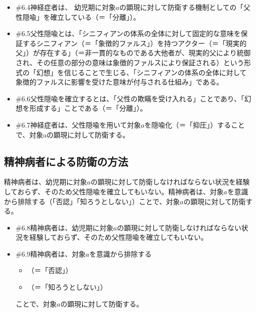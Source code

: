 \begin{note}{}
  \begin{itemize}
    \tightlist
    \item{\#6.4}神経症者は、  幼児期に対象$a$の顕現に対して防衛する機制としての「父性隠喩」を確立している（＝「分離」）。
    \item{\#6.5}父性隠喩とは、「シニフィアンの体系の全体に対して固定的な意味を保証するシニフィアン（＝「象徴的ファルス」）を持つアクター（＝「現実的父」）が存在する」（＝非一貫的なものである大他者が、現実的父により統御され、その任意の部分の意味は象徴的ファルスにより保証される）という形式の「幻想」を信じることで生じる、「シニフィアンの体系の全体に対して象徴的ファルスに影響を受けた意味が付与される仕組み」である。
    \item{\#6.6}父性隠喩を確立するとは、「父性の欺瞞を受け入れる」ことであり、「幻想を形成する」ことである（＝「分離」）。
    \item{\#6.7}神経症者は、父性隠喩を用いて対象$a$を隠喩化（＝「抑圧」）することで、対象aの顕現に対して防衛する。
  \end{itemize}
\end{note}

\subsection{精神病者による防衛の方法}\label{ux7cbeux795eux75c5ux8005ux306bux3088ux308bux9632ux885bux306eux65b9ux6cd5}

精神病者は、幼児期に対象\(a\)の顕現に対して防衛しなければならない状況を経験しておらず、そのため父性隠喩を確立してもいない。精神病者は、対象\(a\)を意識から排除する（「否認」「知ろうとしない」）ことで、対象\(a\)の顕現に対して防衛する。

\begin{note}{}
  \begin{itemize}
    \tightlist
    \item{\#6.8}精神病者は、幼児期に対象$a$の顕現に対して防衛しなければならない状況を経験しておらず、そのため父性隠喩を確立してもいない。
    \item{\#6.9}精神病者は、対象$a$を意識から排除する
      \begin{itemize}
        \tightlist
        \item （＝「否認」）
        \item （＝「知ろうとしない」）
      \end{itemize}ことで、対象$a$の顕現に対して防衛する。
  \end{itemize}
\end{note}

